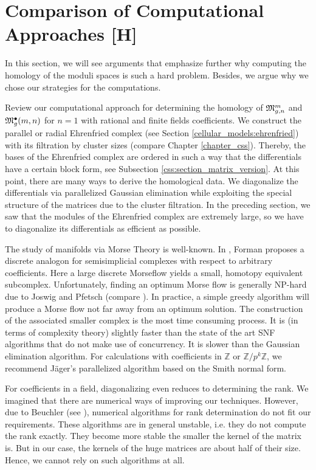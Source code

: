 \section{Comparison of Computational Approaches [H]}

In this section, we will see arguments that emphasize further why computing the homology of the moduli spaces is such a hard problem.
Besides, we argue why we chose our strategies for the computations.

Review our computational approach for determining the homology of $\mathfrak{M}^m_{g,n}$ and $\mathfrak{M}^\bullet_g(m, n)$ for $n = 1$ with rational and finite fields coefficients.
We construct the parallel or radial Ehrenfried complex (see Section \ref{cellular_models:ehrenfried}) with its filtration by cluster sizes (compare Chapter \ref{chapter_css}).
Thereby, the bases of the Ehrenfried complex are ordered in such a way that the differentials have a certain block form, see Subsection \ref{css:section_matrix_version}.
At this point, there are many ways to derive the homological data.
We diagonalize the differentials via parallelized Gaussian elimination while exploiting the special structure of the matrices due to the cluster filtration.
In the preceding section, we saw that the modules of the Ehrenfried complex are extremely large, so we have to diagonalize its differentials as efficient as possible.

The study of manifolds via Morse Theory is well-known.
In \cite{Forman2002}, Forman proposes a discrete analogon for semisimplicial complexes with respect to arbitrary coefficients.
Here a large discrete Morseflow yields a small, homotopy equivalent subcomplex.
Unfortunately, finding an optimum Morse flow is generally NP-hard due to Joswig and Pfetsch (compare \cite{JoswigPfetsch2006}).
In practice, a simple greedy algorithm will produce a Morse flow not far away from an optimum solution.
The construction of the associated smaller complex is the most time consuming process.
It is (in terms of complexity theory) slightly faster than the state of the art SNF algorithms that do not make use of concurrency.
It is slower than the Gaussian elimination algorithm.
For calculations with coefficients in $\mathbb Z$ or $\mathbb Z / p^k \mathbb Z$, we recommend Jäger's parallelized algorithm based on the Smith normal form.

For coefficients in a field, diagonalizing even reduces to determining the rank.
We imagined that there are numerical ways of improving our techniques.
However, due to Beuchler (see \cite{Beuchler201402}), numerical algorithms for rank determination do not fit our requirements.
These algorithms are in general unstable, i.e. they do not compute the rank exactly.
They become more stable the smaller the kernel of the matrix is.
But in our case, the kernels of the huge matrices are about half of their size.
Hence, we cannot rely on such algorithms at all.


